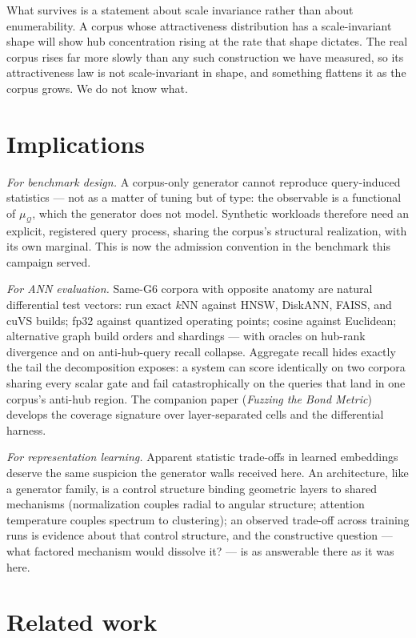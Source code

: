 \documentclass[11pt]{article}
\newcommand{\muQ}{\mu_{\mathcal{Q}}}
\begin{document}
What survives is a statement about scale invariance rather than about
enumerability. A corpus whose attractiveness distribution has a
scale-invariant shape will show hub concentration rising at the rate that
shape dictates. The real corpus rises far more slowly than any such
construction we have measured, so its attractiveness law is not
scale-invariant in shape, and something flattens it as the corpus grows. We
do not know what.

\section{Implications}\label{sec:implications}

\emph{For benchmark design.} A corpus-only generator cannot reproduce
query-induced statistics --- not as a matter of tuning but of type: the
observable is a functional of $\muQ$, which the generator does not model.
Synthetic workloads therefore need an explicit, registered query process,
sharing the corpus's structural realization, with its own marginal. This is
now the admission convention in the benchmark this campaign served.

\emph{For ANN evaluation.} Same-G6 corpora with opposite anatomy are natural
differential test vectors: run exact $k$NN against HNSW, DiskANN, FAISS, and
cuVS builds; fp32 against quantized operating points; cosine against
Euclidean; alternative graph build orders and shardings --- with oracles on
hub-rank divergence and on anti-hub-query recall collapse. Aggregate recall
hides exactly the tail the decomposition exposes: a system can score
identically on two corpora sharing every scalar gate and fail
catastrophically on the queries that land in one corpus's anti-hub region.
The companion paper (\emph{Fuzzing the Bond Metric}) develops the coverage
signature over layer-separated cells and the differential harness.

\emph{For representation learning.} Apparent statistic trade-offs in learned
embeddings deserve the same suspicion the generator walls received here. An
architecture, like a generator family, is a control structure binding
geometric layers to shared mechanisms (normalization couples radial to
angular structure; attention temperature couples spectrum to clustering); an
observed trade-off across training runs is evidence about that control
structure, and the constructive question --- what factored mechanism would
dissolve it? --- is as answerable there as it was here.

\section{Related work}\label{sec:related}
\end{document}

